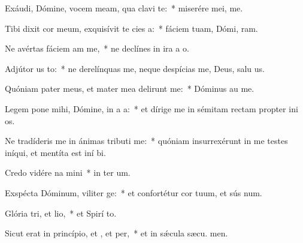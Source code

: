 \item Exáudi, Dómine, vocem meam, qua clavi  te:~* miserére mei,   me.
\item Tibi dixit cor meum, exquisívit te cies a:~* fáciem tuam, Dómi, ram.
\item Ne avértas fáciem am  me,~* ne declínes in ira a  o.
\item Adjútor us to:~* ne derelínquas me, neque despícias me, Deus, salu us.
\item Quóniam pater meus, et mater mea delirunt me:~* Dóminus au  me.
\item Legem pone mihi, Dómine, in a a:~* et dírige me in sémitam rectam propter ini os.
\item Ne tradíderis me in ánimas tributi me:~* quóniam insurrexérunt in me testes iníqui, et mentíta est iní bi.
\item Credo vidére na mini~* in ter um.
\item Exspécta Dóminum, viliter ge:~* et confortétur cor tuum, et sús num.
\item Glória tri, et lio,~* et Spirí to.
\item Sicut erat in princípio, et , et per,~* et in sǽcula sæcu. men.
